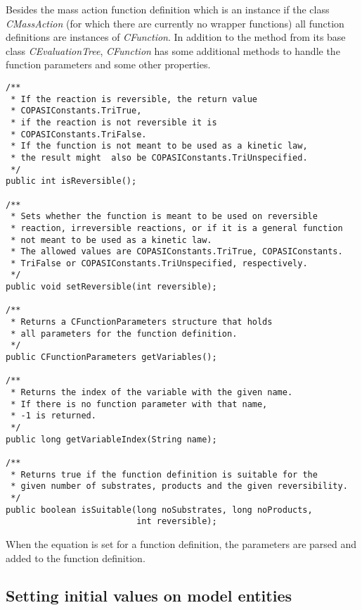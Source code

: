 \documentclass[a4,10pt]{article}
\begin{document}
Besides the mass action function definition which is an instance if the class \textit{CMassAction} (for which there are currently no wrapper functions) all function definitions are instances of \textit{CFunction}. In addition to the method from its base class \textit{CEvaluationTree}, \textit{CFunction} has some additional methods to handle the function parameters and some other properties.

\begin{lstlisting}
/**
 * If the reaction is reversible, the return value
 * COPASIConstants.TriTrue,
 * if the reaction is not reversible it is
 * COPASIConstants.TriFalse.
 * If the function is not meant to be used as a kinetic law,
 * the result might  also be COPASIConstants.TriUnspecified.
 */
public int isReversible();

/**
 * Sets whether the function is meant to be used on reversible
 * reaction, irreversible reactions, or if it is a general function
 * not meant to be used as a kinetic law.
 * The allowed values are COPASIConstants.TriTrue, COPASIConstants.
 * TriFalse or COPASIConstants.TriUnspecified, respectively.
 */
public void setReversible(int reversible);

/**
 * Returns a CFunctionParameters structure that holds
 * all parameters for the function definition.
 */
public CFunctionParameters getVariables();

/**
 * Returns the index of the variable with the given name.
 * If there is no function parameter with that name, 
 * -1 is returned.
 */
public long getVariableIndex(String name);

/**
 * Returns true if the function definition is suitable for the
 * given number of substrates, products and the given reversibility.
 */
public boolean isSuitable(long noSubstrates, long noProducts,
                          int reversible);
\end{lstlisting}

When the equation is set for a function definition, the parameters are parsed and added to the function definition.

\subsection{Setting initial values on model entities}
\end{document}
